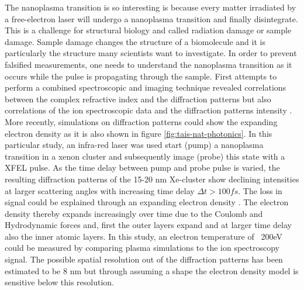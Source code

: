 The nanoplasma transition is so interesting is because every matter irradiated by a free-electron laser will undergo a nanoplasma transition and finally disintegrate. This is a challenge for structural biology and called radiation damage  or sample damage\citep{Neutze-2000-Nature}. Sample damage changes the structure of a biomolecule and it is particularly the structure many scientists want to investigate. In order to prevent falsified measurements, one needs to understand the nanoplasma transition as it occurs while the pulse is propagating through the sample. First attempts to perform a combined spectroscopic and imaging technique revealed correlations between the complex refractive index \citep{Bostedt-2012-PRL} and the diffraction patterns but also correlations of the ion spectroscopic data and the diffraction patterns intensity \citep{Gorkhover-2012-PRL}. More recently, simulations on diffraction patterns could show the expanding electron density \citep{Gorkhover-2016-NatPho} as it is also shown in figure \ref{fig:tais-nat-photonics}. In this particular study, an infra-red laser was used start (pump) a nanoplasma transition in a xenon cluster and subsequently image (probe) this state with a XFEL pulse. As the time delay between pump and probe pulse is varied, the resulting diffraction patterns of the 15-20 nm Xe-cluster show declining intensities at larger scattering angles with increasing time delay $\Delta t>100 fs$. The loss in signal could be explained through an expanding electron density \citep{Hau-Riege-2008-PRE,Peltz-2014-PRL}. The electron density thereby expands increasingly over time due to the Coulomb and Hydrodynamic forces and, first the outer layers expand and at larger time delay also the inner atomic layers. In this study, an electron temperature of ~200eV could be measured by comparing plasma simulations to the ion spectroscopy signal. The possible spatial resolution out of the diffraction patterns has been estimated to be 8 nm but through assuming a shape the electron density model is sensitive below this resolution.\\
